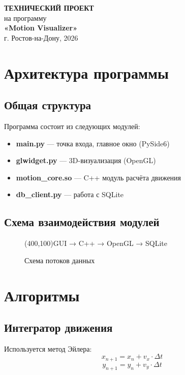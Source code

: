 \documentclass[a4paper,14pt]{extarticle}
\begin{document}
\begin{titlepage}
\begin{center}
\vspace*{2cm}
{\Large \textbf{ТЕХНИЧЕСКИЙ ПРОЕКТ}} \\
\vspace{0.5cm}
{\large на программу} \\
\vspace{0.5cm}
{\huge \textbf{«Motion Visualizer»}} \\
\vspace{0.5cm}
\vfill
г. Ростов-на-Дону, 2026
\end{center}
\end{titlepage}

\tableofcontents
\newpage

\section{Архитектура программы}

\subsection{Общая структура}
Программа состоит из следующих модулей:
\begin{itemize}
    \item \textbf{main.py} — точка входа, главное окно (PySide6)
    \item \textbf{glwidget.py} — 3D-визуализация (OpenGL)
    \item \textbf{motion\_core.so} — C++ модуль расчёта движения
    \item \textbf{db\_client.py} — работа с SQLite
\end{itemize}

\subsection{Схема взаимодействия модулей}
\begin{figure}[H]
\centering
\framebox(400,100){GUI → C++ → OpenGL → SQLite}
\caption{Схема потоков данных}
\end{figure}

\section{Алгоритмы}

\subsection{Интегратор движения}
Используется метод Эйлера:
\[
x_{n+1} = x_n + v_x \cdot \Delta t
\]
\[
y_{n+1} = y_n + v_y \cdot \Delta t
\]
\end{document}
